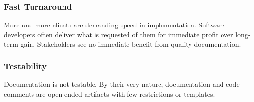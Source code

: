 \subsubsection*{Fast Turnaround}

More and more clients are demanding speed in implementation. Software developers
often deliver what is requested of them for immediate profit over long-term
gain. Stakeholders see no immediate benefit from quality documentation.

\subsubsection*{Testability}

Documentation is not testable. By their very nature, documentation and code
comments are open-ended artifacts with few restrictions or templates.
